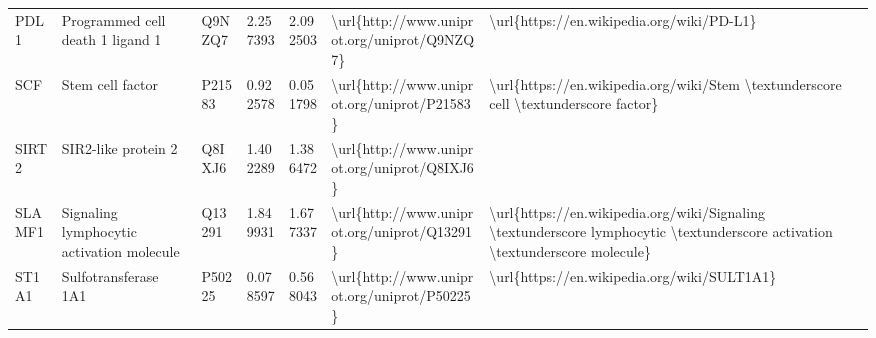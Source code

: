 \begin{table}[]
\begin{tabular}{lllllll}
\multicolumn{1}{l|}{PDL1}     & Programmed cell death 1 ligand 1                              & Q9NZQ7  & 2.257393           & 2.092503          & \textbackslash{}url\{http://www.uniprot.org/uniprot/Q9NZQ7\} & \textbackslash{}url\{https://en.wikipedia.org/wiki/PD-L1\}                                                                                                                                                                                                                                         \\
\multicolumn{1}{l|}{SCF}      & Stem cell factor                                              & P21583  & 0.922578           & 0.051798          & \textbackslash{}url\{http://www.uniprot.org/uniprot/P21583\} & \textbackslash{}url\{https://en.wikipedia.org/wiki/Stem \textbackslash{}textunderscore cell \textbackslash{}textunderscore factor\}                                                                                                                                                                \\
\multicolumn{1}{l|}{SIRT2}    & SIR2-like protein 2                                           & Q8IXJ6  & 1.402289           & 1.386472          & \textbackslash{}url\{http://www.uniprot.org/uniprot/Q8IXJ6\} &                                                                                                                                                                                                                                                                                                    \\
\multicolumn{1}{l|}{SLAMF1}   & Signaling lymphocytic activation molecule                     & Q13291  & 1.849931           & 1.677337          & \textbackslash{}url\{http://www.uniprot.org/uniprot/Q13291\} & \textbackslash{}url\{https://en.wikipedia.org/wiki/Signaling \textbackslash{}textunderscore lymphocytic \textbackslash{}textunderscore activation \textbackslash{}textunderscore molecule\}                                                                                                        \\
\multicolumn{1}{l|}{ST1A1}    & Sulfotransferase 1A1                                          & P50225  & 0.078597           & 0.568043          & \textbackslash{}url\{http://www.uniprot.org/uniprot/P50225\} & \textbackslash{}url\{https://en.wikipedia.org/wiki/SULT1A1\}                                                                                                                                                                                                                                       \\

\end{tabular}
\end{table}
